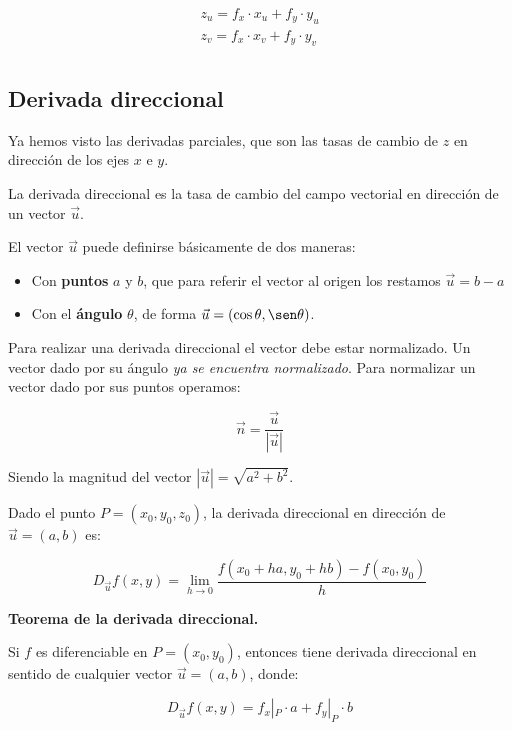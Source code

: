 \begin{align*}
    z_u = f_x\cdot x_u + f_y \cdot y_u \\
    z_v = f_x\cdot x_v + f_y \cdot y_v \\
\end{align*}

\subsection{Derivada direccional}

Ya hemos visto las derivadas parciales,
que son las tasas de cambio de \(z\) en dirección de los ejes \(x\) e \(y\).

La derivada direccional es la tasa de cambio del campo vectorial en dirección 
de un vector \(\vec{u}\).

El vector \(\vec{u}\) puede definirse básicamente de dos maneras:
\begin{itemize}
    \item Con \textbf{puntos} \(a\) y \(b\), 
    que para referir el vector al origen los restamos \(\vec{u} = b-a\)
    \item Con el \textbf{ángulo} \(\theta\),
    de forma \(\vec{u} = (\cos \theta, \sen \theta)\).
\end{itemize}

Para realizar una derivada direccional el vector debe estar normalizado.
Un vector dado por su ángulo \textit{ya se encuentra normalizado}.
Para normalizar un vector dado por sus puntos operamos:

\begin{equation*}
    \vec{n} = \frac{\vec{u}}{|\vec{u}|}
\end{equation*}

Siendo la magnitud del vector \(|\vec{u}| = \sqrt{a^{2} + b^{2}}\).

Dado el punto \(P = (x_0, y_0, z_0)\), 
la derivada direccional en dirección de \(\vec{u} = (a,b)\) es:

\begin{equation*}
    D_{\vec{u}}f(x,y) = \lim_{h \to 0}
    \frac{f(x_0 + ha, y_0 + hb) - f(x_0,y_0)}{h}
\end{equation*}

\textbf{Teorema de la derivada direccional.}

Si \(f\) es diferenciable en \(P = (x_0,y_0)\),
entonces tiene derivada direccional en sentido de cualquier vector 
\(\vec{u} = (a,b)\), donde:

\begin{equation*}
    D_{\vec{u}}f(x,y) = f_x|_{P} \cdot a + f_y|_{P} \cdot b
\end{equation*}


